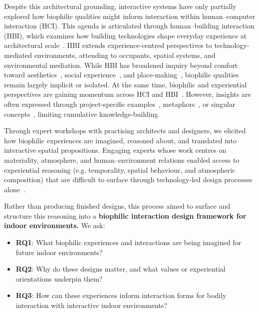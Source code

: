 Despite this architectural grounding, interactive systems have only partially explored how biophilic qualities might inform interaction within human–computer interaction (HCI). This agenda is articulated through human--building interaction (HBI), which examines how building technologies shape everyday experience at architectural scale~\cite{alavi2019introduction, becerik2022field}. HBI extends experience-centred perspectives to technology-mediated environments, attending to occupants, spatial systems, and environmental mediation. While HBI has broadened inquiry beyond comfort toward aesthetics~\cite{economidou2021moving}, social experience~\cite{hoare2015hide}, and place-making~\cite{beale2022digital}, biophilic qualities remain largely implicit or isolated. At the same time, biophilic and experiential perspectives are gaining momentum across HCI and HBI~\cite{rao2025lessons, rao2025designing, margariti2024human, margariti2024evaluating, han2024superarchitectural}. However, insights are often expressed through project-specific examples~\cite{behrens2018sentiment}, metaphors~\cite{deng2019diffusive}, or singular concepts~\cite{wang2022nature}, limiting cumulative knowledge-building.

Through expert workshops with practising architects and designers, we elicited how biophilic experiences are imagined, reasoned about, and translated into interactive spatial propositions. Engaging experts whose work centres on materiality, atmosphere, and human–environment relations enabled access to experiential reasoning (e.g. temporality, spatial behaviour, and atmospheric composition) that are difficult to surface through technology-led design processes alone~\cite{alavi2019introduction, alavi2018artifacts}. 

Rather than producing finished designs, this process aimed to surface and structure this reasoning into a \textbf{biophilic interaction design framework for indoor environments.} We ask:

\begin{itemize}
    \item \textbf{RQ1}: What biophilic experiences and interactions are being imagined for future indoor environments?
    \item \textbf{RQ2}: Why do these designs matter, and what values or experiential orientations underpin them?
    \item \textbf{RQ3}: How can these experiences inform interaction forms for bodily interaction with interactive indoor environments?
\end{itemize}

